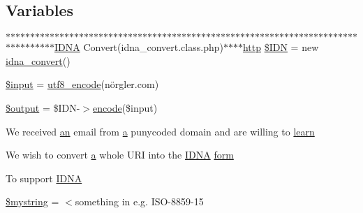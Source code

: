 \subsection*{Variables}
\begin{DoxyCompactItemize}
\item 
$\ast$$\ast$$\ast$$\ast$$\ast$$\ast$$\ast$$\ast$$\ast$$\ast$$\ast$$\ast$$\ast$$\ast$$\ast$$\ast$$\ast$$\ast$$\ast$$\ast$$\ast$$\ast$$\ast$$\ast$$\ast$$\ast$$\ast$$\ast$$\ast$$\ast$$\ast$$\ast$$\ast$$\ast$$\ast$$\ast$$\ast$$\ast$$\ast$$\ast$$\ast$$\ast$$\ast$$\ast$$\ast$$\ast$$\ast$$\ast$$\ast$$\ast$$\ast$$\ast$$\ast$$\ast$$\ast$$\ast$$\ast$$\ast$$\ast$$\ast$$\ast$$\ast$$\ast$$\ast$$\ast$$\ast$$\ast$$\ast$$\ast$$\ast$$\ast$$\ast$$\ast$$\ast$$\ast$$\ast$$\ast$$\ast$$\ast$$\ast$$\ast$$\ast$\hyperlink{ReadMe_8txt_a5d4f4ee07624e2d22494ccae4cc77d48}{I\+D\+NA} Convert(idna\+\_\+convert.\+class.\+php)$\ast$$\ast$$\ast$$\ast$\hyperlink{LICENSE_8txt_ac4b61a1f8e5f59d19b9a24b25b336db1}{http} \hyperlink{ReadMe_8txt_aa45ac61e5ada434ea385befcd1aea16d}{\$\+I\+DN} = new \hyperlink{classidna__convert}{idna\+\_\+convert}()
\item 
\hyperlink{ReadMe_8txt_a69b271260be394b90709736cccb22c76}{\$input} = \hyperlink{ReadMe_8txt_ad2cb466e866a85c1ddff5eb4320f0ef1}{utf8\+\_\+encode}(\textquotesingle{}nörgler.\+com\textquotesingle{})
\item 
\hyperlink{ReadMe_8txt_aa3809a6a370ae4aeb5c4e9a7527950ac}{\$output} = \$I\+DN-\/$>$\hyperlink{ReadMe_8txt_a7fcb4e5f2b1b63096ccac2903dfbef97}{encode}(\$input)
\item 
We received \hyperlink{jquery-1_8x_8min_8js_ada4b4d9ce9b76d68aeaf886e5325561f}{an} email from \hyperlink{jqplot_8barRenderer_8min_8js_a15f14caa0c9de3a415d8eb9d88378fc0}{a} punycoded domain and are willing to \hyperlink{ReadMe_8txt_a1d2bfa89fe8b4d0500b8f0b135034594}{learn}
\item 
We wish to convert \hyperlink{jqplot_8barRenderer_8min_8js_a15f14caa0c9de3a415d8eb9d88378fc0}{a} whole U\+RI into the \hyperlink{ReadMe_8txt_a5d4f4ee07624e2d22494ccae4cc77d48}{I\+D\+NA} \hyperlink{ReadMe_8txt_a4d93093c68b5e8c12de9bf3182195739}{form}
\item 
To support \hyperlink{ReadMe_8txt_a5d4f4ee07624e2d22494ccae4cc77d48}{I\+D\+NA}
\item 
\hyperlink{ReadMe_8txt_a503c6b90c33b5264d35bf22df6f91b28}{\$mystring} = \textquotesingle{}$<$something in e.\+g. I\+SO-\/8859-\/15\textquotesingle{}
\end{DoxyCompactItemize}


